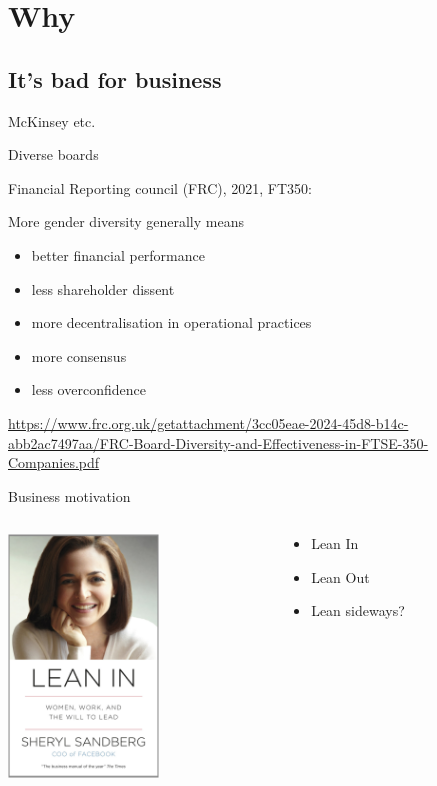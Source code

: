\documentclass[xcolor=table]{beamer}
\begin{document}
\section{Why}

\subsection{It's bad for business}

\begin{frame}{McKinsey etc. }

\end{frame}
\begin{frame}{Diverse boards}

	Financial Reporting council (FRC), 2021, FT350:

More gender diversity generally means 
	\begin{itemize}
		\item better financial performance
		\item less shareholder dissent
		\item more decentralisation in operational practices
		\item more consensus
		\item less overconfidence
	\end{itemize}


	\tiny{\url{https://www.frc.org.uk/getattachment/3cc05eae-2024-45d8-b14c-abb2ac7497aa/FRC-Board-Diversity-and-Effectiveness-in-FTSE-350-Companies.pdf}}
\end{frame}

\begin{frame}{Business motivation}
	\begin{columns}
		\begin{column}{0.5\textwidth}
	\includegraphics[width=4cm]{lean.jpg}
		\end{column}
		\begin{column}{0.5\textwidth}
			\begin{itemize}
					\pause
				\item Lean In
					\pause
				\item Lean Out
					\pause
				\item Lean sideways?
			\end{itemize}

		\end{column}
	\end{columns}
\end{frame}
\end{document}
